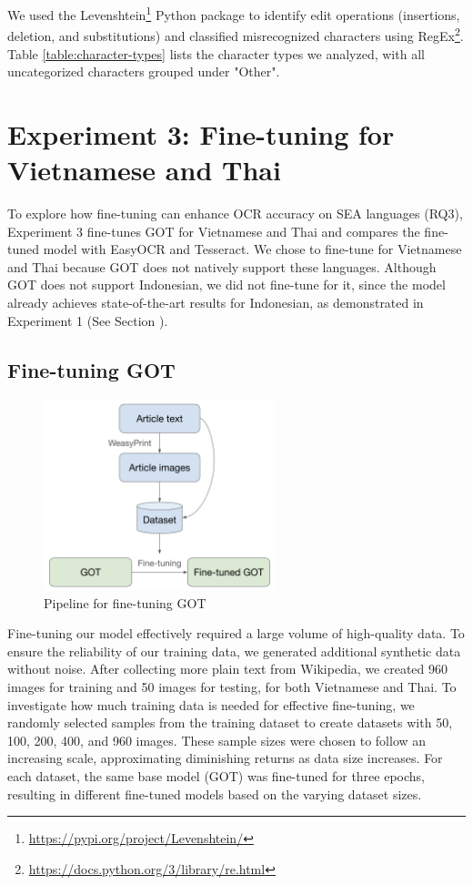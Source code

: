 \documentclass[12pt,oneside]{memoir}
\begin{document}
We used the Levenshtein\footnote{\url{https://pypi.org/project/Levenshtein/}} Python package to identify edit operations (insertions, deletion, and substitutions) and classified misrecognized characters using RegEx\footnote{\url{https://docs.python.org/3/library/re.html}}. 
Table \ref{table:character-types} lists the character types we analyzed, with all uncategorized characters grouped under "Other".

\section{Experiment 3: Fine-tuning for Vietnamese and Thai} \label{section:experiment-3}

To explore how fine-tuning can enhance OCR accuracy on SEA languages (RQ3), Experiment 3 fine-tunes GOT for Vietnamese and Thai and compares the fine-tuned model with EasyOCR and Tesseract. 
We chose to fine-tune for Vietnamese and Thai because GOT does not natively support these languages. 
Although GOT does not support Indonesian, we did not fine-tune for it, since the model already achieves state-of-the-art results for Indonesian, as demonstrated in Experiment 1 (See Section ). 

\subsection{Fine-tuning GOT}

\begin{figure}[ht]
    \centering
    \includegraphics[width=0.6\textwidth]{images/fine-tuning.png}
    \caption{Pipeline for fine-tuning GOT}
    \label{figure:fine-tuning}
\end{figure}

Fine-tuning our model effectively required a large volume of high-quality data. 
To ensure the reliability of our training data, we generated additional synthetic data without noise. 
After collecting more plain text from Wikipedia, we created 960 images for training and 50 images for testing, for both Vietnamese and Thai.
To investigate how much training data is needed for effective fine-tuning, we randomly selected samples from the training dataset to create datasets with 50, 100, 200, 400, and 960 images. 
These sample sizes were chosen to follow an increasing scale, approximating diminishing returns as data size increases.
For each dataset, the same base model (GOT) was fine-tuned for three epochs, resulting in different fine-tuned models based on the varying dataset sizes.
\end{document}
